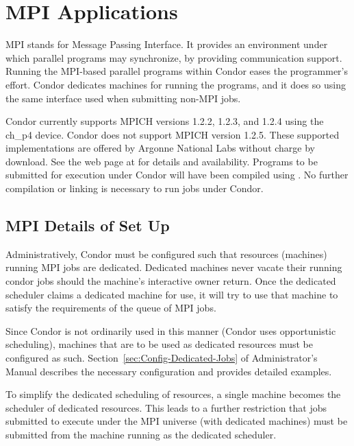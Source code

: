 \section{\label{sec:MPI}MPI Applications}
MPI stands for Message Passing Interface.
It provides an environment under which parallel programs
may synchronize, 
by providing communication support.
Running the MPI-based parallel programs within Condor 
eases the programmer's effort.
Condor dedicates machines for running the programs,
and it does so using the same interface used when submitting
non-MPI jobs.

Condor currently supports MPICH versions 1.2.2, 1.2.3, and 1.2.4
using the ch\_p4 device. 
Condor does not support MPICH version 1.2.5.
These supported implementations are
offered by Argonne National Labs
without charge by download.
See the web page at
for details and availability.
Programs to be submitted for execution under Condor will have
been compiled using .
No further compilation or linking is necessary to run jobs
under Condor.

\subsection{\label{sec:MPI-setup}MPI Details of Set Up}

Administratively, Condor must be configured such that resources
(machines) running MPI jobs are dedicated.
Dedicated machines never vacate their running condor jobs
should the machine's interactive owner return.  Once the dedicated 
scheduler claims a dedicated machine for use, it will try to use
that machine to satisfy the requirements of the queue of MPI jobs.

Since Condor is not ordinarily used in this manner (Condor uses
opportunistic scheduling),
machines that are to be used as dedicated resources
must be configured as such.
Section~\ref{sec:Config-Dedicated-Jobs} of
Administrator's Manual describes the necessary
configuration and provides detailed examples.

To simplify the dedicated scheduling of resources,
a single machine becomes the scheduler of dedicated resources.
This leads to a further restriction that jobs submitted
to execute under the MPI universe (with dedicated machines)
must be
submitted from the machine running as the dedicated scheduler.

